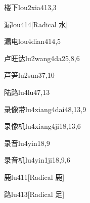 \begin{entry}{楼下}{lou2xia4}{13,3}
\end{entry}

\begin{entry}{漏}{lou4}{14}[Radical 水]
\end{entry}

\begin{entry}{漏电}{lou4dian4}{14,5}
\end{entry}

\begin{entry}{卢旺达}{lu2wang4da2}{5,8,6}
\end{entry}

\begin{entry}{芦笋}{lu2sun3}{7,10}
\end{entry}

\begin{entry}{陆路}{lu4lu4}{7,13}
\end{entry}

\begin{entry}{录像带}{lu4xiang4dai4}{8,13,9}
\end{entry}

\begin{entry}{录像机}{lu4xiang4ji1}{8,13,6}
\end{entry}

\begin{entry}{录音}{lu4yin1}{8,9}
\end{entry}

\begin{entry}{录音机}{lu4yin1ji1}{8,9,6}
\end{entry}

\begin{entry}{鹿}{lu4}{11}[Radical 鹿]
\end{entry}

\begin{entry}{路}{lu4}{13}[Radical 足]
\end{entry}

